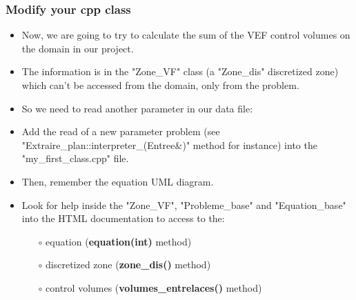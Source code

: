 \documentclass[10pt, hyperref={unicode=true,pdfusetitle, bookmarks=true,bookmarksnumbered=false,bookmarksopen=false, breaklinks=false,pdfborder={0 0 1},backref=true,colorlinks=true,linkcolor=darkblue,pageanchor, urlcolor=darkblue}]{beamer}
\begin{document}
\begin{frame}
\frametitle{Modify your cpp class}
\begin{block}{}
\begin{itemize}
\item Now, we are going to try to calculate the sum of the VEF control volumes on the domain in our project.

\item The information is in the "Zone\_VF" class (a "Zone\_dis" discretized zone) which can't be accessed 
from the domain, only from the problem. 

\item So we need to read another parameter in our data file:\\
\begin{center}
\end{center}

\item Add the read of a new parameter problem (see "Extraire\_plan::interpreter\_(Entree\&)" method for instance) into the "my\_first\_class.cpp" file.

\item Then, remember the equation UML diagram.

\item Look for help inside the "Zone\_VF", "Probleme\_base" and "Equation\_base" into the HTML documentation to access to the:
    \begin{itemize}
    \item [$\circ$] equation (\textbf{equation(int)} method)
    \item [$\circ$] discretized zone (\textbf{zone\_dis()} method)
    \item [$\circ$] control volumes (\textbf{volumes\_entrelaces()} method)
    \end{itemize}
\end{itemize}

\end{block}
\end{frame}
\end{document}
